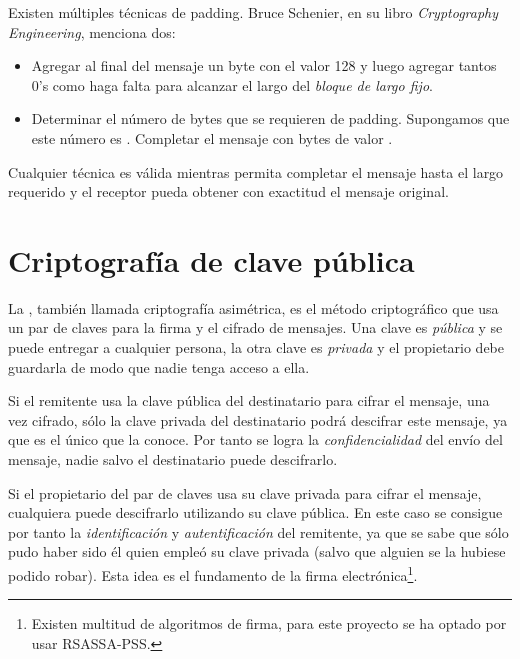  Existen múltiples técnicas de padding. Bruce Schenier, en su libro \emph{Cryptography Engineering}, menciona dos:
 \begin{itemize}
 \item Agregar al final del mensaje un byte con el valor 128 y luego agregar tantos 0’s como haga falta para alcanzar el largo del \emph{bloque de largo fijo}.
 \item Determinar el número de bytes que se requieren de padding. Supongamos que este número es . Completar el mensaje con  bytes de valor .
 \end{itemize}

 Cualquier técnica es válida mientras permita completar el mensaje hasta el largo requerido y el receptor pueda obtener con exactitud el mensaje original. \emph{\parencite{Reference8}}


 \section{Criptografía de clave pública}

 La , también llamada criptografía asimétrica, es el método criptográfico que usa un par de claves para la firma y el cifrado de mensajes.
 Una clave es \emph{pública} y se puede entregar a cualquier persona, la otra clave es \emph{privada} y el propietario debe guardarla de modo que nadie tenga acceso a ella.

 Si el remitente usa la clave pública del destinatario para cifrar el mensaje, una vez cifrado, sólo la clave privada del destinatario podrá descifrar este mensaje, ya que es el único que la conoce.
 Por tanto se logra la \emph{confidencialidad} del envío del mensaje, nadie salvo el destinatario puede descifrarlo.

 Si el propietario del par de claves usa su clave privada para cifrar el mensaje, cualquiera puede descifrarlo utilizando su clave pública.
 En este caso se consigue por tanto la \emph{identificación} y \emph{autentificación} del remitente, ya que se sabe que sólo pudo haber sido él quien empleó su clave privada (salvo que alguien se la hubiese podido robar).
 Esta idea es el fundamento de la firma electrónica\footnote{Existen multitud de algoritmos de firma, para este proyecto se ha optado por usar RSASSA-PSS.}. \emph{\parencite{Reference5}}

